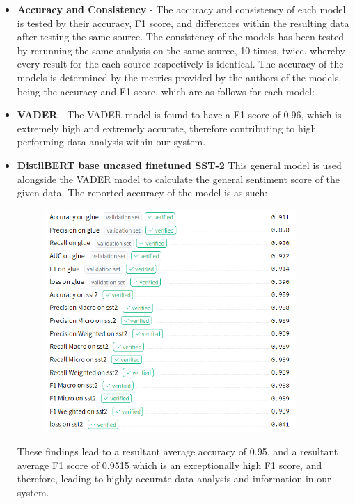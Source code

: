 \documentclass[12pt]{article}
\begin{document}
\begin{itemize}
    \item \textbf{Accuracy and Consistency} - The accuracy and consistency of each model is tested by their accuracy, F1 score, and differences within the resulting data after testing the same source.
          The consistency of the models has been tested by rerunning the same analysis on the same source, 10 times, twice, whereby every result for the each source respectively is identical.
          The accuracy of the models is determined by the metrics provided by the authors of the models, being the accuracy and F1 score, which are as follows for each model:
    \item \textbf{VADER} - The VADER model is found to have a F1 score of 0.96, which is extremely high and extremely accurate, therefore contributing to high performing data analysis within our system.
    \item \textbf{DistilBERT base uncased finetuned SST-2} This general model is used alongside the VADER model to calculate the general sentiment score of the given data. The reported accuracy of the model is as such:
          \begin{figure}[H]
              \centering
              \includegraphics[width=0.9\textwidth]{GeneralAccuracy.png}
          \end{figure}
          These findings lead to a resultant average accuracy of 0.95, and a resultant average F1 score of 0.9515 which is an exceptionally high F1 score, and therefore, leading to highly accurate data analysis and information in our system.


\end{itemize}
\end{document}
